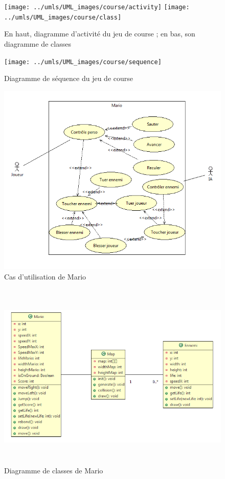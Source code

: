 \begin{figure}[h]
 \centering
 \texttt{[image: ../umls/UML\_images/course/activity]} \hfill
 \texttt{[image: ../umls/UML\_images/course/class]} \hfill
 \caption{En haut, diagramme d'activité du jeu de course ; en bas, son diagramme de classes}
\end{figure}

\begin{figure}[h]
 \centering
 \texttt{[image: ../umls/UML\_images/course/sequence]} \hfill
 \caption{Diagramme de séquence du jeu de course}
\end{figure}

\clearpage

\begin{figure}[h]
 \centering
 \includegraphics[width=\textwidth]{../umls/UML_images/Mario/Utilisation} \hfill
 \caption{Cas d'utilisation de Mario}
\end{figure}

\begin{figure}[h]
 \centering
 \includegraphics[height=9cm]{../umls/UML_images/Mario/Class} \hfill
 \caption{Diagramme de classes de Mario}
\end{figure}

